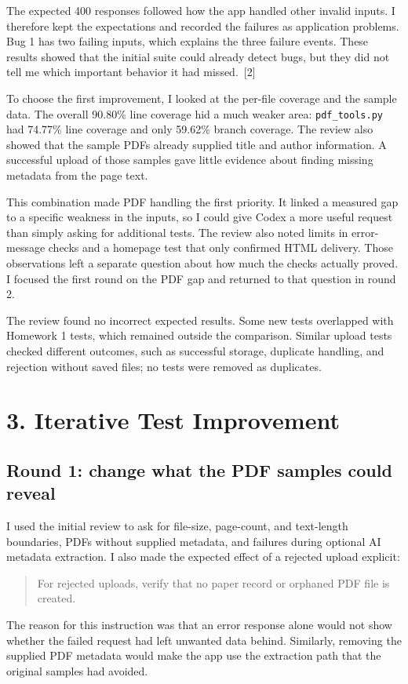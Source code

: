 \documentclass[10pt,letterpaper]{article}
\newcommand{\reportsection}[1]{\section*{\color{black}#1}}
\newcommand{\reportsubsection}[1]{\subsection*{\color{black}#1}}
\begin{document}
The expected 400 responses followed how the app handled other invalid inputs. I therefore kept the expectations and recorded the failures as application problems. Bug 1 has two failing inputs, which explains the three failure events. These results showed that the initial suite could already detect bugs, but they did not tell me which important behavior it had missed.~[2]

To choose the first improvement, I looked at the per-file coverage and the sample data. The overall 90.80\% line coverage hid a much weaker area: \texttt{pdf\_tools.py} had 74.77\% line coverage and only 59.62\% branch coverage. The review also showed that the sample PDFs already supplied title and author information. A successful upload of those samples gave little evidence about finding missing metadata from the page text.

This combination made PDF handling the first priority. It linked a measured gap to a specific weakness in the inputs, so I could give Codex a more useful request than simply asking for additional tests. The review also noted limits in error-message checks and a homepage test that only confirmed HTML delivery. Those observations left a separate question about how much the checks actually proved. I focused the first round on the PDF gap and returned to that question in round 2.

The review found no incorrect expected results. Some new tests overlapped with Homework 1 tests, which remained outside the comparison. Similar upload tests checked different outcomes, such as successful storage, duplicate handling, and rejection without saved files; no tests were removed as duplicates.

\reportsection{3. Iterative Test Improvement}

\reportsubsection{Round 1: change what the PDF samples could reveal}

I used the initial review to ask for file-size, page-count, and text-length boundaries, PDFs without supplied metadata, and failures during optional AI metadata extraction. I also made the expected effect of a rejected upload explicit:
\begin{quote}
\small
For rejected uploads, verify that no paper record or orphaned PDF file is created.
\end{quote}

The reason for this instruction was that an error response alone would not show whether the failed request had left unwanted data behind. Similarly, removing the supplied PDF metadata would make the app use the extraction path that the original samples had avoided.
\end{document}
